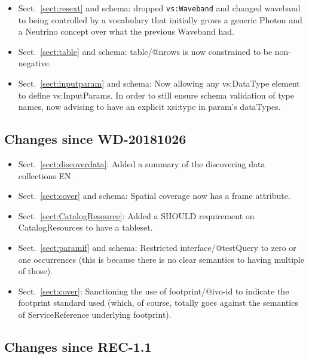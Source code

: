 \documentclass[11pt,a4paper]{ivoa}
\begin{document}
\begin{itemize}
\item Sect.~\ref{sect:resext} and schema:
dropped \verb|vs:Waveband| and changed waveband to being
controlled by a vocabulary that initially grows a generic Photon and a
Neutrino concept over what the previous Waveband had.
\item Sect.~\ref{sect:table} and schema: table/@nrows is now constrained to be non-negative.
\item Sect.~\ref{sect:inputparam} and schema:
Now allowing any vs:DataType element to define vs:InputParams.
In order to still ensure schema validation of type names,
now advising to have an explicit xsi:type in param's dataTypes.
\end{itemize}

\subsection{Changes since  WD-20181026}

\begin{itemize}
\item Sect.~\ref{sect:discoverdata}:
Added a summary of the discovering data collections EN.
\item Sect.~\ref{sect:cover} and schema:
Spatial coverage now has a frame attribute.
\item Sect.~\ref{sect:CatalogResource}:
Added a SHOULD requirement on CatalogResources to
have a tableset.
\item Sect.~\ref{sect:paramif} and schema:
Restricted interface/@testQuery to zero or one occurrences (this
is because there is no clear semantics to having multiple of those).
\item Sect.~\ref{sect:cover}:
Sanctioning the use of footprint/@ivo-id to indicate the footprint
standard used (which, of course, totally goes against the semantics of
ServiceReference underlying footprint).
\end{itemize}

\subsection{Changes since REC-1.1}
\end{document}
